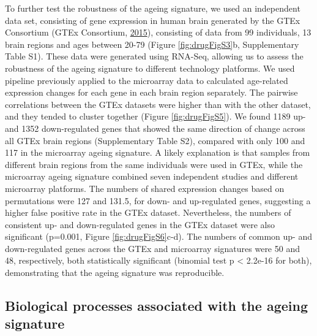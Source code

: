 \documentclass[12pt,twoside]{unicam}
\begin{document}
To further test the robustness of the ageing signature, we used an independent data set, consisting of gene expression in human brain generated by the GTEx Consortium (GTEx Consortium, \protect\hyperlink{ref-GTEx_Consortium2015}{2015}), consisting of data from 99 individuals, 13 brain regions and ages between 20-79 (Figure \ref{fig:drugFigS3}b, Supplementary Table S1). These data were generated using RNA-Seq, allowing us to assess the robustness of the ageing signature to different technology platforms. We used pipeline previously applied to the microarray data to calculated age-related expression changes for each gene in each brain region separately. The pairwise correlations between the GTEx datasets were higher than with the other dataset, and they tended to cluster together (Figure \ref{fig:drugFigS5}). We found 1189 up- and 1352 down-regulated genes that showed the same direction of change across all GTEx brain regions (Supplementary Table S2), compared with only 100 and 117 in the microarray ageing signature. A likely explanation is that samples from different brain regions from the same individuals were used in GTEx, while the microarray ageing signature combined seven independent studies and different microarray platforms. The numbers of shared expression changes based on permutations were 127 and 131.5, for down- and up-regulated genes, suggesting a higher false positive rate in the GTEx dataset. Nevertheless, the numbers of consistent up- and down-regulated genes in the GTEx dataset were also significant (p=0.001, Figure \ref{fig:drugFigS6}c-d). The numbers of common up- and down-regulated genes across the GTEx and microarray signatures were 50 and 48, respectively, both statistically significant (binomial test p \textless{} 2.2e-16 for both), demonstrating that the ageing signature was reproducible.

\hypertarget{ageingSignatureBiology}{%
\subsection{Biological processes associated with the ageing signature}\label{ageingSignatureBiology}}
\end{document}
